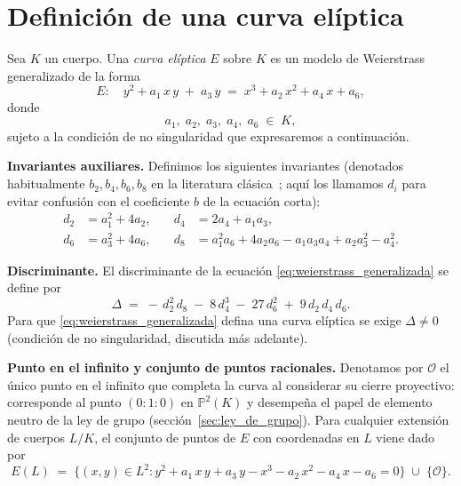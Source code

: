 \section{Definición de una curva elíptica}\label{sec:definicion_curvas_elipticas}
\begin{definicion}\label{def:definicion_curvas_elipticas}
Sea $K$ un cuerpo. Una \emph{curva elíptica} $E$ sobre $K$ es un modelo de Weierstrass generalizado de la forma
\begin{equation}\label{eq:weierstrass_generalizada}
  E:\quad y^2 + a_1\,x\,y \;+\; a_3\,y \;=\; x^3 + a_2\,x^2 + a_4\,x + a_6,
\end{equation}
donde
\[
a_1,\;a_2,\;a_3,\;a_4,\;a_6 \;\in\; K,
\]
sujeto a la condición de no singularidad que expresaremos a continuación.

\medskip

\noindent\textbf{Invariantes auxiliares.} Definimos los siguientes invariantes (denotados habitualmente $b_2, b_4, b_6, b_8$ en la literatura clásica~\cite{silverman1986aec,hankerson2004guide}; aquí los llamamos $d_i$ para evitar confusión con el coeficiente $b$ de la ecuación corta):
\[
\begin{aligned}
  d_2 &= a_1^2 + 4a_2, &\quad
  d_4 &= 2a_4 + a_1 a_3,\\
  d_6 &= a_3^2 + 4a_6, &\quad
  d_8 &= a_1^2 a_6 + 4a_2 a_6 - a_1 a_3 a_4 + a_2 a_3^2 - a_4^2.
\end{aligned}
\]

\medskip

\noindent\textbf{Discriminante.} El discriminante de la ecuación \eqref{eq:weierstrass_generalizada} se define por
\[
  \Delta \;=\;-\,d_2^2\,d_8 \;-\; 8\,d_4^3 \;-\; 27\,d_6^2 \;+\; 9\,d_2\,d_4\,d_6.
\]
Para que \eqref{eq:weierstrass_generalizada} defina una curva elíptica se exige $\Delta \neq 0$ (condición de no singularidad, discutida más adelante).

\medskip

\noindent\textbf{Punto en el infinito y conjunto de puntos racionales.}  
Denotamos por $\mathcal{O}$ el único punto en el infinito que completa la curva al considerar su cierre proyectivo: corresponde al punto $(0:1:0)$ en $\mathbb{P}^2(K)$ y desempeña el papel de elemento neutro de la ley de grupo (sección~\ref{sec:ley_de_grupo}). Para cualquier extensión de cuerpos $L/K$, el conjunto de puntos de $E$ con coordenadas en $L$ viene dado por
\[
  E(L) \;=\; \bigl\{(x,y)\in L^2 : y^2 + a_1\,x\,y + a_3\,y - x^3 - a_2\,x^2 - a_4\,x - a_6 = 0 \bigr\}
  \;\cup\;\{\mathcal{O}\}.
\]
\end{definicion}


